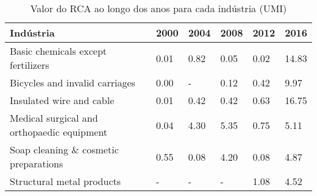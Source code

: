 \begin{table}
\centering
\caption{Valor do RCA ao longo dos anos para cada indústria (UMI)}
\begin{tabular}{p{6cm}p{1.5cm}p{1.5cm}p{1.5cm}p{1.5cm}p{1.5cm}}
\toprule
                                 Indústria & 2000 & 2004 & 2008 & 2012 &  2016 \\
\midrule
        Basic chemicals except fertilizers & 0.01 & 0.82 & 0.05 & 0.02 & 14.83 \\
            Bicycles and invalid carriages & 0.00 &    - & 0.12 & 0.42 &  9.97 \\
                  Insulated wire and cable & 0.01 & 0.42 & 0.42 & 0.63 & 16.75 \\
Medical surgical and orthopaedic equipment & 0.04 & 4.30 & 5.35 & 0.75 &  5.11 \\
     Soap cleaning \& cosmetic preparations & 0.55 & 0.08 & 4.20 & 0.08 &  4.87 \\
                 Structural metal products &    - &    - &    - & 1.08 &  4.52 \\
\bottomrule
\end{tabular}
\end{table}
